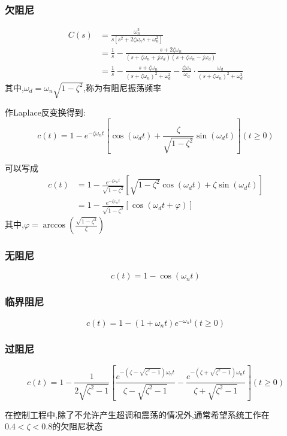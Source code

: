 \documentclass[12pt,a4paper,oneside]{ctexart}
\begin{document}
\subsubsection{欠阻尼}
\begin{align*}
    C(s) &= \frac{\omega_n^2}{s\left[s^2+2\zeta \omega_n s+\omega_n^2\right]}\\
    &= \frac{1}{s}-\frac{s+2\zeta \omega_n}{(s+\zeta \omega_n + j\omega_d)(s+\zeta \omega_n - j\omega_d)}\\
    &= \frac{1}{s}-\frac{s+\zeta \omega_n}{(s+\zeta \omega_n)^2+\omega_d^2}-\frac{\zeta \omega_n}{\omega_d}\cdot \frac{\omega_d}{(s+\zeta \omega_n)^2+\omega_d^2}
\end{align*}
其中,$\omega_d=\omega_n\sqrt{1-\zeta^2}$,称为有阻尼振荡频率

作Laplace反变换得到:
\[
    c(t)=1-e^{-\zeta \omega_n t}\left[\cos(\omega_d t)+\frac{\zeta}{\sqrt{1-\zeta^2}}\sin(\omega_d t)\right](t\geqslant 0)
\]

可以写成
\begin{align*}
    c(t)&=1-\frac{e^{-\zeta \omega_n t}}{\sqrt{1-\zeta^2}}\left[\sqrt{1-\zeta^2}\cos(\omega_dt)+\zeta\sin(\omega_dt)\right]\\
    &=1-\frac{e^{-\zeta \omega_n t}}{\sqrt{1-\zeta^2}}\left[\cos(\omega_dt+\varphi)\right]
\end{align*}
其中,$\varphi=\arccos(\frac{\sqrt{1-\zeta^2}}{\zeta})$

\subsubsection{无阻尼}
\[
    c(t)=1-\cos(\omega_n t)
\]

\subsubsection{临界阻尼}
\[
    c(t)=1-\left(1+\omega_n t\right)e^{-\omega_n t}(t\geqslant 0)
\]

\subsubsection{过阻尼}
\[
    c(t)=1-\frac{1}{2\sqrt{\zeta^2-1}}\left[\frac{e^{-(\zeta-\sqrt{\zeta^2-1})\omega_nt}}{\zeta-\sqrt{\zeta^2-1}} - \frac{e^{-(\zeta+\sqrt{\zeta^2-1})\omega_nt}}{\zeta+\sqrt{\zeta^2-1}}\right](t\geqslant 0)
\]

在控制工程中,除了不允许产生超调和震荡的情况外,通常希望系统工作在$0.4<\zeta<0.8$的欠阻尼状态
\end{document}
